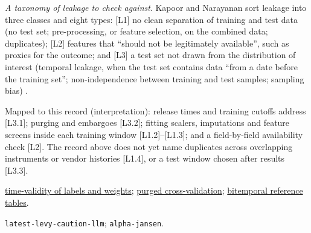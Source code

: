 \begin{qfmethod}
\emph{A taxonomy of leakage to check against}. Kapoor and Narayanan sort leakage into three classes and eight types: [L1] no clean separation of training and test data (no test set; pre-processing, or feature selection, on the combined data; duplicates); [L2] features that ``should not be legitimately available'', such as proxies for the outcome; and [L3] a test set not drawn from the distribution of interest (temporal leakage, when the test set contains data ``from a date before the training set''; non-independence between training and test samples; sampling bias) \citep[sec.~2.4, PDF pp.~5--6]{wide-kapoor-narayanan-leakage}.

Mapped to this record (interpretation): release times and training cutoffs address [L3.1]; purging and embargoes [L3.2]; fitting scalers, imputations and feature screens inside each training window [L1.2]--[L1.3]; and a field-by-field availability check [L2]. The record above does not yet name duplicates across overlapping instruments or vendor histories [L1.4], or a test window chosen after results [L3.3].

 \hyperref[pit:label-weight-leakage]{time-validity of labels and weights}; \hyperref[meth:purged-embargoed-cross-validation]{purged cross-validation}; \hyperref[meth:bitemporal-reference-tables]{bitemporal reference tables}.

 \nolinkurl{latest-levy-caution-llm}; \nolinkurl{alpha-jansen}.

\end{qfmethod}
